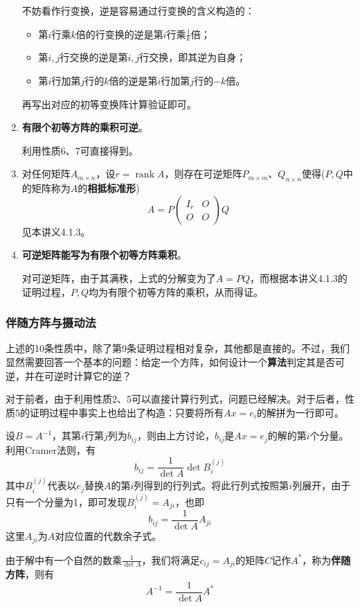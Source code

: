 \documentclass[a4paper,UTF8,fontset=windows]{ctexart}
\DeclareMathOperator{\rank}{rank}
\begin{document}
\begin{enumerate}
    不妨看作行变换，逆是容易通过行变换的含义构造的：
    \begin{itemize}
        \item 第$i$行乘$k$倍的行变换的逆是第$i$行乘$\frac{1}{k}$倍；
        \item 第$i,j$行交换的逆是第$i,j$行交换，即其逆为自身；
        \item 第$i$行加第$j$行的$k$倍的逆是第$i$行加第$j$行的$-k$倍。
    \end{itemize}
    再写出对应的初等变换阵计算验证即可。

    \item \textbf{有限个初等方阵的乘积可逆}。
    
    利用性质6、7可直接得到。

    \item 对任何矩阵$A_{m\times n}$，设$r=\rank A$，则存在可逆矩阵$P_{m\times m}$、$Q_{n\times n}$使得($P,Q$中的矩阵称为$A$的\textbf{相抵标准形})
    $$A=P\begin{pmatrix}I_r&O\\O&O\end{pmatrix}Q$$
    见本讲义4.1.3。

    \item \textbf{可逆矩阵能写为有限个初等方阵乘积}。

    对可逆矩阵，由于其满秩，上式的分解变为了$A=PQ$，而根据本讲义4.1.3的证明过程，$P,Q$均为有限个初等方阵的乘积，从而得证。
\end{enumerate}

\subsubsection{伴随方阵与摄动法}
上述的10条性质中，除了第9条证明过程相对复杂，其他都是直接的。不过，我们显然需要回答一个基本的问题：给定一个方阵，如何设计一个\textbf{算法}判定其是否可逆，并在可逆时计算它的逆？

对于前者，由于利用性质2、5可以直接计算行列式，问题已经解决。对于后者，性质5的证明过程中事实上也给出了构造：只要将所有$Ax=e_i$的解拼为一行即可。

设$B=A^{-1}$，其第$i$行第$j$列为$b_{ij}$，则由上方讨论，$b_{ij}$是$Ax=e_j$的解的第$i$个分量。利用Cramer法则，有
$$b_{ij}=\frac{1}{\det A}\det B_i^{(j)}$$
其中$B_i^{(j)}$代表以$e_j$替换$A$的第$i$列得到的行列式。将此行列式按照第$i$列展开，由于只有一个分量为1，即可发现$B_i^{(j)}=A_{ji}$，也即
$$b_{ij}=\frac{1}{\det A}A_{ji}$$
这里$A_{ji}$为$A$对应位置的代数余子式。

由于解中有一个自然的数乘$\frac{1}{\det A}$，我们将满足$c_{ij}=A_{ji}$的矩阵$C$记作$A^*$，称为\textbf{伴随方阵}，则有
$$A^{-1}=\frac{1}{\det A}A^*$$
\end{document}
